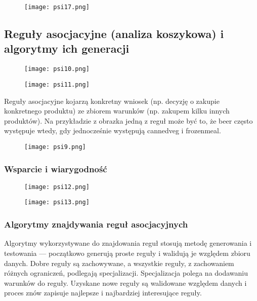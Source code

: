 \documentclass[a4paper,15pt]{article}
\begin{document}
\begin{figure}[H]
\centerline{\texttt{[image: psi17.png]}}
\end{figure}




\subsection{Reguły asocjacyjne (analiza koszykowa) i algorytmy ich generacji}

\begin{figure}[H]
\centerline{\texttt{[image: psi10.png]}}
\end{figure}

\begin{figure}[H]
\centerline{\texttt{[image: psi11.png]}}
\end{figure}


Reguły asocjacyjne kojarzą konkretny wniosek (np. decyzję o zakupie konkretnego produktu) ze zbiorem warunków (np. zakupem kilku innych produktów). Na przykładzie z obrazka jedną z reguł może być to, że beer często występuje wtedy, gdy jednocześnie występują cannedveg i frozenmeal. 

\begin{figure}[H]
\centerline{\texttt{[image: psi9.png]}}
\end{figure}

\subsubsection{Wsparcie i wiarygodność}

\begin{figure}[H]
\centerline{\texttt{[image: psi12.png]}}
\end{figure}

\begin{figure}[H]
\centerline{\texttt{[image: psi13.png]}}
\end{figure}

\subsubsection{Algorytmy znajdywania reguł asocjacyjnych}

Algorytmy wykorzystywane do znajdowania reguł stosują metodę generowania i testowania — początkowo generują proste reguły i walidują je względem zbioru danych. Dobre reguły są zachowywane, a wszystkie reguły, z zachowaniem różnych ograniczeń, podlegają specjalizacji. Specjalizacja polega na dodawaniu warunków do reguły. Uzyskane nowe reguły są walidowane względem danych i proces znów zapisuje najlepsze i najbardziej interesujące reguły. 
\end{document}
